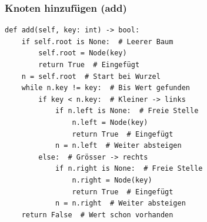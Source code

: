 \ZSFmanualColumnBreak
\subsubsection{Knoten hinzufügen (add)}
\begin{procedure}
\end{procedure}
\begin{codebox}
\begin{lstlisting}[style=CodeExpert]
def add(self, key: int) -> bool:
    if self.root is None:  # Leerer Baum
        self.root = Node(key)
        return True  # Eingefügt
    n = self.root  # Start bei Wurzel
    while n.key != key:  # Bis Wert gefunden
        if key < n.key:  # Kleiner -> links
            if n.left is None:  # Freie Stelle
                n.left = Node(key)
                return True  # Eingefügt
            n = n.left  # Weiter absteigen
        else:  # Grösser -> rechts
            if n.right is None:  # Freie Stelle
                n.right = Node(key)
                return True  # Eingefügt
            n = n.right  # Weiter absteigen
    return False  # Wert schon vorhanden
\end{lstlisting}
\end{codebox}


